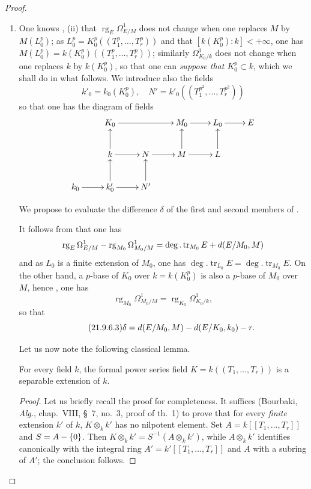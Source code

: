\begin{proof}
\begin{enumerate}
  \item[(i)] One knows , (ii) that $\operatorname{rg}_E\Omega^1_{E/M}$ does not change when one replaces $M$ by $M(L_0^p)$; as $L_0^p=K_0^p((T_1^p,\ldots,T_r^p))$ and that $[k(K_0^p):k]<+\infty$, one has $M(L_0^p)=k(K_0^p)((T_1^p,\ldots,T_r^p))$;
  similarly $\Omega^1_{K_0/k}$ does not change when one replaces $k$ by $k(K_0^p)$, so that one can \emph{suppose that $K_0^p\subset k$}, which we shall do in what follows.
  We introduce also the fields
  \[
    k'_0=k_0(K_0^p),\quad N'=k'_0((T_1^{p^2},\ldots,T_r^{p^2}))
  \]
  so that one has the diagram of fields
  \[
    \xymatrix{
      & K_0\ar[rr] & & M_0\ar[r] & L_0\ar[r] & E\\
      & k\ar[u]\ar[r] & N\ar[r] & M\ar[u]\ar[r] & L\ar[u]\\
      k_0\ar[r] & k'_0\ar[u]\ar[r] & N'\ar[u]
    }
  \]

  We propose to evaluate the difference $\delta$ of the first and second members of .

  It follows from  that one has
  \[
    \operatorname{rg}_E\Omega^1_{E/M}-\operatorname{rg}_{M_0}\Omega^1_{M_0/M}=\deg.\operatorname{tr}_{M_0}E+d(E/M_0,M)
  \]
  and as $L_0$ is a finite extension of $M_0$, one has $\deg.\operatorname{tr}_{L_0} E=\deg.\operatorname{tr}_{M_0} E$.
  On the other hand, a $p$-base of $K_0$ over $k=k(K_0^p)$ is also a $p$-base of $M_0$ over $M$, hence , one has
  \[
    \operatorname{rg}_{M_0}\Omega^1_{M_0/M}=\operatorname{rg}_{K_0}\Omega^1_{K_0/k},
  \]
  so that
  \begin{equation}
  \tag{21.9.6.3}
  \label{0.21.9.6.3}
    \delta=d(E/M_0,M)- d(E/K_0,k_0)- r.
  \end{equation}

  Let us now note the following classical lemma.

  \begin{lemma}[21.9.6.4]
  \label{0.21.9.6.4}
  For every field $k$, the formal power series field $K=k((T_1,\ldots,T_r))$ is a separable extension of $k$.
  \end{lemma}

  \begin{proof}
  Let us briefly recall the proof for completeness.
  It suffices (Bourbaki, \emph{Alg.}, chap.~VIII, \S~7, no.~3, proof of th.~1) to prove that for every \emph{finite} extension $k'$ of $k$, $K\otimes_k k'$ has no nilpotent element.
  Set $A=k[[T_1,\ldots,T_r]]$ and $S=A-\{0\}$.
  Then $K\otimes_k k'=S^{-1}(A\otimes_k k')$, while $A\otimes_k k'$ identifies canonically with the integral ring $A'=k'[[T_1,\ldots,T_r]]$ and $A$ with a subring of $A'$; the conclusion follows.
  \end{proof}


\end{enumerate}
\end{proof}
